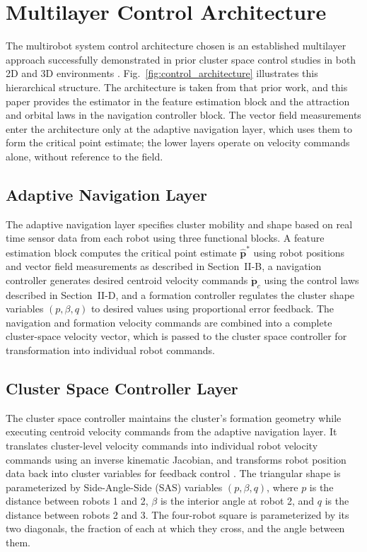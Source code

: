 \documentclass[lettersize,journal]{IEEEtran}
\begin{document}
\section{Multilayer Control Architecture}


The multirobot system control architecture chosen is an established multilayer approach successfully demonstrated in prior cluster space control studies in both 2D and 3D environments \cite{5,7,8,9,10}. Fig.~\ref{fig:control_architecture} illustrates this hierarchical structure. The architecture is taken from that prior work, and this paper provides the estimator in the feature estimation block and the attraction and orbital laws in the navigation controller block. The vector field measurements enter the architecture only at the adaptive navigation layer, which uses them to form the critical point estimate; the lower layers operate on velocity commands alone, without reference to the field.



\subsection{Adaptive Navigation Layer}

The adaptive navigation layer specifies cluster mobility and shape based on real time sensor data from each robot using three functional blocks. A feature estimation block computes the critical point estimate $\hat{\mathbf{p}}^*$ using robot positions and vector field measurements as described in Section~II-B, a navigation controller generates desired centroid velocity commands $\dot{\mathbf{p}}_c$ using the control laws described in Section~II-D, and a formation controller regulates the cluster shape variables $(p, \beta, q)$ to desired values using proportional error feedback. The navigation and formation velocity commands are combined into a complete cluster-space velocity vector, which is passed to the cluster space controller for transformation into individual robot commands.

\subsection{Cluster Space Controller Layer}

The cluster space controller maintains the cluster's formation geometry while executing centroid velocity commands from the adaptive navigation layer. It translates cluster-level velocity commands into individual robot velocity commands using an inverse kinematic Jacobian, and transforms robot position data back into cluster variables for feedback control \cite{50}. The triangular shape is parameterized by Side-Angle-Side (SAS) variables $(p, \beta, q)$, where $p$ is the distance between robots 1 and 2, $\beta$ is the interior angle at robot 2, and $q$ is the distance between robots 2 and 3. The four-robot square is parameterized by its two diagonals, the fraction of each at which they cross, and the angle between them.
\end{document}
